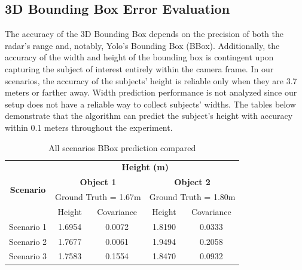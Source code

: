\subsection{3D Bounding Box Error Evaluation}\label{sec:3-bbox}
The accuracy of the 3D Bounding Box depends on the precision of both the radar's range and, notably, 
Yolo's Bounding Box (BBox). 
Additionally, the accuracy of the width and height of the bounding box is contingent upon capturing the subject of interest entirely within the camera frame. 
In our scenarios, the accuracy of the subjects' height is reliable only when they are 3.7 meters or farther away. 
Width prediction performance is not analyzed since our setup does not have a reliable way to collect subjects' widths.
The tables below demonstrate that the algorithm can predict the subject's height with accuracy within 0.1 meters throughout the experiment.
\begin{table}[h!]
    \begin{center}
      \label{tab:table3}
      \begin{tabular}{c|c|c|c|c} %
        \multirow{4}{*}{\textbf{Scenario}} & \multicolumn{4}{c}{\textbf{Height (m)}}\\\cline{2-5}
                                            & \multicolumn{2}{c|}{\textbf{Object 1}}  & \multicolumn{2}{c}{\textbf{Object 2}}\\
                                            & \multicolumn{2}{c|}{Ground Truth = 1.67m }& \multicolumn{2}{c}{Ground Truth = 1.80m}\\
                                            \cline{2-5}
                                            & Height & Covariance & Height & Covariance \\
        \hline
        Scenario 1                          & 1.6954 & 0.0072 & 1.8190 & 0.0333   \\
        Scenario 2                          & 1.7677 & 0.0061 & 1.9494 & 0.2058  \\
        Scenario 3                          & 1.7583 & 0.1554 & 1.8470 & 0.0932  \\
      \end{tabular}
    \end{center}
    \caption{All scenarios BBox prediction compared}
    \label{tab:bbox_table}
  \end{table}


